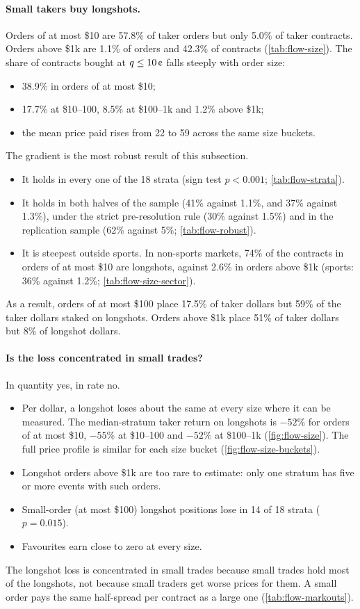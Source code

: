 \paragraph{Small takers buy longshots.} Orders of at most \$10 are 57.8\% of taker orders but
only 5.0\% of taker contracts. Orders above \$1k are 1.1\% of orders and 42.3\% of contracts
(\cref{tab:flow-size}). The share of contracts bought at $\q\le10\cents$ falls steeply with
order size:
\begin{itemize}
  \item 38.9\% in orders of at most \$10;
  \item 17.7\% at \$10--100, 8.5\% at \$100--1k and 1.2\% above \$1k;
  \item the mean price paid rises from 22\cents{} to 59\cents{} across the same size buckets.
\end{itemize}
The gradient is the most robust result of this subsection.
\begin{itemize}
  \item It holds in every one of the 18 strata (sign test $p<0.001$; \cref{tab:flow-strata}).
  \item It holds in both halves of the sample (41\% against 1.1\%, and 37\% against 1.3\%), under
  the strict pre-resolution rule (30\% against 1.5\%) and in the replication sample (62\%
  against 5\%; \cref{tab:flow-robust}).
  \item It is steepest outside sports. In non-sports markets, 74\% of the contracts in orders of
  at most \$10 are longshots, against 2.6\% in orders above \$1k (sports: 36\% against 1.2\%;
  \cref{tab:flow-size-sector}).
\end{itemize}
As a result, orders of at most \$100 place 17.5\% of taker dollars but 59\% of the taker dollars
staked on longshots. Orders above \$1k place 51\% of taker dollars but 8\% of longshot dollars.

\paragraph{Is the loss concentrated in small trades?} In quantity yes, in rate no.
\begin{itemize}
  \item Per dollar, a longshot loses about the same at every size where it can be measured. The
  median-stratum taker return on longshots is $-52\%$ for orders of at most \$10, $-55\%$ at
  \$10--100 and $-52\%$ at \$100--1k (\cref{fig:flow-size}). The full price profile is similar
  for each size bucket (\cref{fig:flow-size-buckets}).
  \item Longshot orders above \$1k are too rare to estimate: only one stratum has five or more
  events with such orders.
  \item Small-order (at most \$100) longshot positions lose in 14 of 18 strata ($p=0.015$).
  \item Favourites earn close to zero at every size.
\end{itemize}
The longshot loss is concentrated in small trades because small trades hold most of the
longshots, not because small traders get worse prices for them. A small order pays the same
half-spread per contract as a large one (\cref{tab:flow-markouts}).

